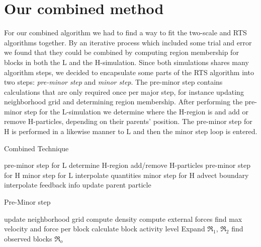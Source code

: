 \documentclass[../../main.tex]{subfiles}
\begin{document}
\tracingall



\section{Our combined method}


For our combined algorithm we had to find a way to fit the two-scale and RTS algorithms together. By an iterative process which included some trial and error we found that they could be combined by computing region membership for blocks in both the L and the H-simulation. Since both simulations shares many algorithm steps, we decided to encapsulate some parts of the RTS algorithm into two steps: \textit{pre-minor step} and \textit{minor step}. The pre-minor step contains calculations that are only required once per major step, for instance updating neighborhood grid and determining region membership. After performing the pre-minor step for the L-simulation we determine where the H-region is and add or remove H-particles, depending on their parents' position. The pre-minor step for H is performed in a likewise manner to L and then the minor step loop is entered. 

\begin{algorithm}[h]
    \caption{Combined Technique}
    \label{alg:combined:main}
    \begin{algorithmic}[1]
            \State pre-minor step for L
            \State determine H-region
            \State add/remove H-particles
            \State pre-minor step for H
                \State minor step for L
                \State interpolate quantities
                  \State minor step for H
                  \State advect boundary
                \EndFor
            \State interpolate feedback info
            \EndFor
            \State update parent particle
        \EndWhile
   \end{algorithmic}
\end{algorithm}


\begin{algorithm}[h]
    \caption{Pre-Minor step}
    \label{alg:combined:preminorstep}
    \begin{algorithmic}[1]
    \State update neighborhood grid
    \State compute density
    \State compute external forces
    \State find max velocity and force per block
    \State calculate block activity level
    \State Expand $\Re$$_1$, $\Re$$_2$
    \State find observed blocks $\Re$$_o$
   \end{algorithmic}
\end{algorithm}
\end{document}
